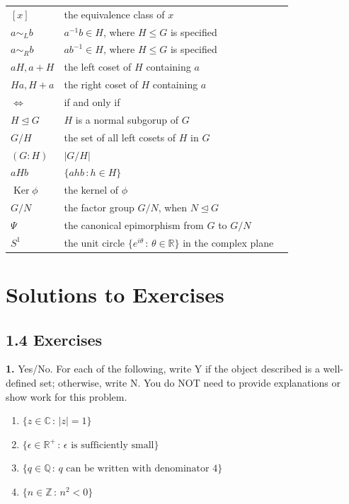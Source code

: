 \documentclass[10pt,]{book}
\theoremstyle{plain}
\theoremstyle{definition}
\theoremstyle{definition}
\theoremstyle{definition}
\theoremstyle{definition}
\numberwithin{equation}{section}
\def\Z{\mathbb{Z}}
\def\R{\mathbb{R}}
\def\Q{\mathbb{Q}}
\def\C{\mathbb{C}}
\DeclareMathOperator{\Ker}{Ker}
\def\siml{\sim_L}
\def\simr{\sim_R}
\newcommand{\lt}{ < }
\begin{document}
\begin{longtable}[l]{lp{}r}
$[x]$&the equivalence class of \(x\)&\pageref{notation-63}\\
$a\siml b $& \(
   a^{-1}b\in H\), where \(H\leq G\) is specified&\pageref{notation-64}\\
$a\simr b$&\(
   ab^{-1}\in H\), where \(H\leq G\) is specified&\pageref{notation-65}\\
$aH, a+H$&the left coset of \(H\) containing \(a\)&\pageref{notation-66}\\
$Ha, H+a$&the right coset of \(H\) containing \(a\)&\pageref{notation-67}\\
$\Leftrightarrow$&if and only if&\pageref{notation-68}\\
$H\unlhd G$&\(H\) is a normal subgorup of \(G\)&\pageref{notation-69}\\
$G/H$&the set of all left cosets of \(H\) in \(G\)&\pageref{notation-70}\\
$(G:H)$&\(|G/H|\)&\pageref{notation-71}\\
$aHb$&\(\{ahb\,:h\in H\}\)&\pageref{notation-72}\\
$\Ker \phi$&the kernel of \(\phi\)&\pageref{notation-73}\\
$G/N$&the factor group \(G/N\), when \(N\unlhd G\)&\pageref{notation-74}\\
$\Psi$&the canonical epimorphism from \(G\) to \(G/N\)&\pageref{notation-75}\\
$S^1$&the unit circle  \(\{e^{i\theta} \,:\, \theta\in
    \R\}\) in the complex plane&\pageref{notation-76}\\
\end{longtable}
\typeout{************************************************}
\typeout{************************************************}
\chapter[{Solutions to Exercises}]{Solutions to Exercises}\label{appendix-2}
\section*{1.4 Exercises}
\noindent\textbf{1.}\quad{}
        Yes/No. For each of the following, write Y if the object described is a well-defined set; otherwise, write N. You do NOT need to provide explanations or show work for this problem.
        \leavevmode%
\begin{enumerate}[label=(\alph*)]
\item\hypertarget{li-23}{}
              \(\{z \in \C \,:\, |z|=1\}\)
\item\hypertarget{li-24}{}
              \(\{\epsilon \in \R^+\,:\, \epsilon \mbox{ is sufficiently small} \}\)
\item\hypertarget{li-25}{}
              \(\{q\in \Q \,:\, q \mbox{ can be written  with denominator } 4\}\)
\item\hypertarget{li-26}{}
              \(\{n \in \Z\,:\, n^2 \lt 0\}\)
\end{enumerate}
\end{document}
